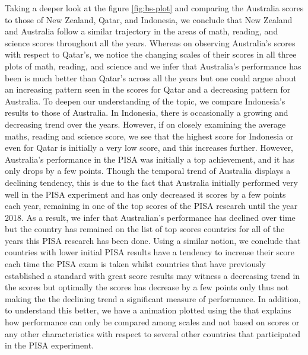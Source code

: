 Taking a deeper look at the figure \ref{fig:bs-plot} and comparing the
Australia scores to those of New Zealand, Qatar, and Indonesia, we
conclude that New Zealand and Australia follow a similar trajectory in
the areas of math, reading, and science scores throughout all the years.
Whereas on observing Australia's scores with respect to Qatar's, we
notice the changing scales of their scores in all three plots of math,
reading, and science and we infer that Australia's performance has been
is much better than Qatar's across all the years but one could argue
about an increasing pattern seen in the scores for Qatar and a
decreasing pattern for Australia. To deepen our understanding of the
topic, we compare Indonesia's results to those of Australia. In
Indonesia, there is occasionally a growing and decreasing trend over the
years. However, if on closely examining the average maths, reading and
science score, we see that the highest score for Indonesia or even for
Qatar is initially a very low score, and this increases further.
However, Australia's performance in the PISA was initially a top
achievement, and it has only drops by a few points. Though the temporal
trend of Australia displays a declining tendency, this is due to the
fact that Australia initially performed very well in the PISA experiment
and has only decreased it scores by a few points each year, remaining in
one of the top scores of the PISA research until the year 2018. As a
result, we infer that Australian's performance has declined over time
but the country has remained on the list of top scores countries for all
of the years this PISA research has been done. Using a similar notion,
we conclude that countries with lower initial PISA results have a
tendency to increase their score each time the PISA exam is taken whilst
countries that have previously established a standard with great score
results may witness a decreasing trend in the scores but optimally the
scores has decrease by a few points only thus not making the the
declining trend a significant measure of performance. In addition, to
understand this better, we have a animation plotted using
 \citep{gganimate} the that explains how performance
can only be compared among scales and not based on scores or any other
characteristics with respect to several other countries that
participated in the PISA experiment.



\address{%
Priya Ravindra Dingorkar\\
Monash University\\%
Department Econometrics and Business Statistics\\ Clayton, Australia\\
%
\url{https://www.linkedin.com/in/priya-dingorkar/}\\%
%
\href{mailto:priyadingorkar@gmail.com}{\nolinkurl{priyadingorkar@gmail.com}}%
}

